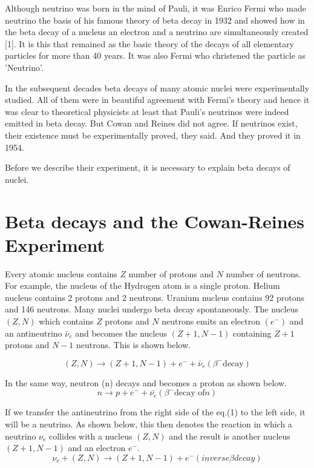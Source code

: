 Although neutrino was born in the mind of Pauli, it was Enrico Fermi
who made neutrino the basis of his famous theory of beta decay in 1932 and
showed how in the beta decay of a nucleus an electron and a neutrino are
simultaneously created [1]. It is this that remained as the basic theory of the
decays of all elementary particles for more than 40 years. It was also Fermi
who christened the particle as ’Neutrino’.

In the subsequent decades beta decays of many atomic nuclei were experimentally studied. All of them were in beautiful agreement with Fermi’s
theory and hence it was clear to theoretical physicists at least that Pauli’s
neutrinos were indeed emitted in beta decay. But Cowan and Reines did not
agree. If neutrinos exist, their existence must be experimentally proved, they
said. And they proved it in 1954.

Before we describe their experiment, it is necessary to explain beta decays
of nuclei.

\section{Beta decays and the Cowan-Reines\\ Experiment}

Every atomic nucleus contains $Z$ number of protons and $N$ number of
neutrons. For example, the nucleus of the Hydrogen atom is a single proton.
Helium nucleus contains 2 protons and 2 neutrons. Uranium nucleus contains
92 protons and 146 neutrons. Many nuclei undergo beta decay spontaneously.
The nucleus $(Z,N)$ which contains $Z$ protons and $N$ neutrons emits an electron
$(e^{-})$ and an antineutrino $\bar{\nu}_{e}$ and becomes the nucleus $(Z+1,N-1)$ containing
$Z+1$ protons and $N-1$ neutrons. This is shown below.

\newpage

\begin{equation}
(Z, N) \rightarrow (Z + 1, N-1)+ e^{-} + \bar{\nu}_{e}(\beta^{-} \text{decay})
\end{equation}

In the same way, neutron (n) decays and becomes a proton as shown below.
\begin{equation}
n \rightarrow p + e^{-} + \bar{\nu_{e}} (\beta^{-} \text{decay of} n)
\end{equation}

If we transfer the antineutrino from the right side of the eq.(1) to the left
side, it will be a neutrino. As shown below, this then denotes the reaction in
which a neutrino $\nu_{e}$ collides with a nucleus $(Z,N)$ and the result is another
nucleus $(Z+1, N-1)$ and an electron $e^{-}$.
\begin{equation}
\nu_{e} + (Z, N) \rightarrow (Z + 1, N-1) + e^{-} (inverse \beta decay)
\end{equation}

